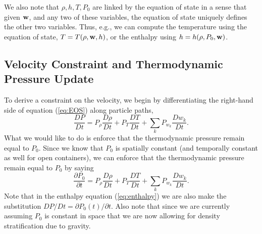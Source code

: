 \documentclass[final]{siamltex}
\def\wb {{\bf w}}
\begin{document}
We also note that $\rho, h, T, P_0$ are linked by the equation of state
in a sense that given
$\wb$, and any two of these variables, the equation of state uniquely defines the other
two variables.  Thus, e.g., we can compute the temperature using
the equation of state, $T = T(\rho,\wb,h)$, or the enthalpy using $h = h(\rho,P_0,\wb)$.

\subsection{Velocity Constraint and Thermodynamic Pressure Update}
To derive a constraint on the velocity, we begin by differentiating the 
right-hand side of equation (\ref{eq:EOS}) along particle paths,
\begin{equation}
\frac{DP}{Dt} = P_\rho\frac{D\rho}{Dt} + P_T\frac{DT}{Dt} + \sum_kP_{w_k}\frac{Dw_k}{Dt}.
\end{equation}
What we would like to do is enforce that the thermodynamic pressure remain equal
to $P_0$.  Since we know that $P_0$ is spatially constant (and temporally constant as well
for open containers), we can enforce that the thermodynamic pressure remain equal
to $P_0$ by saying
\begin{equation}
\frac{\partial P_0}{\partial t} = P_\rho\frac{D\rho}{Dt} + P_T\frac{DT}{Dt} + \sum_kP_{w_k}\frac{Dw_k}{Dt}.\label{eq:particle paths}
\end{equation}
Note that in the enthalpy equation (\ref{eq:enthalpy}) we are also make the
substitution $DP/Dt = \partial P_0(t)/\partial t$.  Also note that since we
are currently assuming $P_0$ is constant in space that we are now allowing
for density stratification due to gravity.\\
\end{document}
